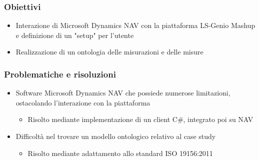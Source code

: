 \documentclass{beamer}
\begin{document}
\begin{frame}
\frametitle{Obiettivi}
\begin{itemize}
	\item Interazione di Microsoft Dynamics NAV con la piattaforma LS-Genio Mashup e definizione di un "setup" per l'utente
	
	
	\item Realizzazione di un ontologia delle misurazioni e delle misure
\end{itemize}	
\end{frame}

\begin{frame}
\frametitle{Problematiche e risoluzioni}
\begin{itemize}
\item Software Microsoft Dynamics NAV che possiede numerose limitazioni, ostacolando l'interazione con la piattaforma
\begin{itemize}
	\item Risolto mediante implementazione di un client C\#, integrato poi su NAV
\end{itemize}


\item Difficoltà nel trovare un modello ontologico relativo al case study
\begin{itemize}
	\item Risolto mediante adattamento allo standard ISO 19156:2011
\end{itemize}
\end{itemize}	
\end{frame}
\end{document}
